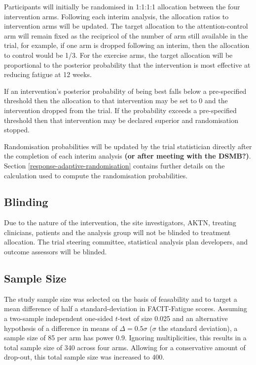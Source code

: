 \documentclass[
]{article}
\begin{document}
Participants will initially be randomised in 1:1:1:1 allocation between the four intervention arms.
Following each interim analysis, the allocation ratios to intervention arms will be updated.
The target allocation to the attention-control arm will remain fixed as the recipricol of the number of arm still available in the trial, for example, if one arm is dropped following an interim, then the allocation to control would be 1/3.
For the exercise arms, the target allocation will be proportional to the posterior probability that the intervention is most effective at reducing fatigue at 12 weeks.

If an intervention's posterior probability of being best falls below a pre-specified threshold then the allocation to that intervention may be set to 0 and the intervention dropped from the trial.
If the probability exceeds a pre-specified threshold then that intervention may be declared superior and randomisation stopped.

Randomisation probabilities will be updated by the trial statistician directly after the completion of each interim analysis \textbf{(or after meeting with the DSMB?)}.
Section \ref{response-adaptive-randomisation} contains further details on the calculation used to compute the randomisation probabilities.

\hypertarget{blinding}{%
  \subsection{Blinding}\label{blinding}}

  Due to the nature of the intervention, the site investigators, AKTN, treating clinicians, patients and the analysis group will not be blinded to treatment allocation. 
  The trial steering committee, statistical analysis plan developers, and outcome assessors will be blinded. 

\hypertarget{sample-size}{%
  \subsection{Sample Size}\label{sample-size}}

The study sample size was selected on the basis of feasability and to target a mean difference of half a standard-deviation in FACIT-Fatigue scores.
Assuming a two-sample independent one-sided $t$-test of size 0.025 and an alternative hypothesis of a difference in means of $\Delta=0.5\sigma$ ($\sigma$ the standard deviation), a sample size of 85 per arm has power 0.9.
Ignoring multiplicities, this results in a total sample size of 340 across four arms.
Allowing for a conservative amount of drop-out, this total sample size was increased to 400.
\end{document}
